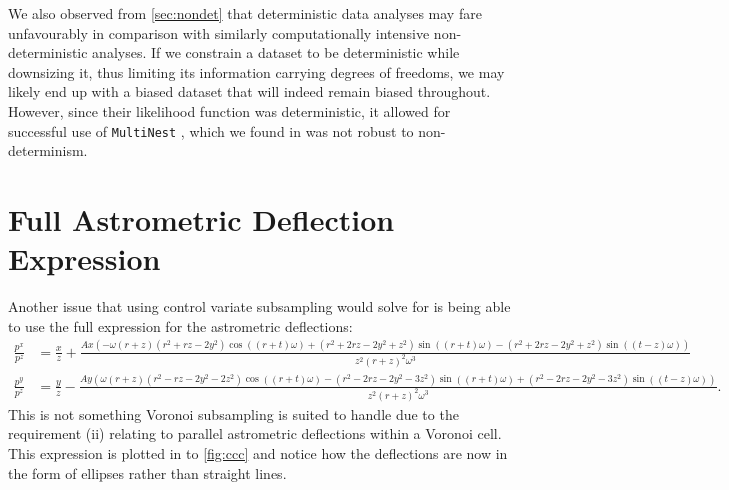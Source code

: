 We also observed from \cref{sec:nondet} that deterministic data analyses may fare unfavourably in comparison with similarly computationally intensive non-deterministic analyses. If we constrain a dataset to be deterministic while downsizing it, thus limiting its information carrying degrees of freedoms, we may likely end up with a biased dataset that will indeed remain biased throughout. However, since their likelihood function was deterministic, it allowed for successful use of \texttt{MultiNest} \cite{Feroz_2009}, which we found in  was not robust to non-determinism.

\section{Full Astrometric Deflection Expression}

Another issue that using control variate subsampling would solve for is being able to use the full expression for the astrometric deflections:
%
\begin{equation}
    \begin{aligned}
        \textstyle \frac{p^x}{p^z} &= \textstyle \frac{x}{z} + \frac{A x\left(-\omega  \left(r +z \right) \left(r^2+r z -2 y^2\right) \cos \left(\left(r + t \right) \omega \right)+\left(r^2+2 r z -2 y^2+z^2\right) \sin \left(\left(r + t \right) \omega \right)-\left(r^2+2 r z -2 y^2+z^2\right) \sin \left((t-z)\omega \right)\right)}{z^2 \left(r +z \right)^2 \omega^3} \\
        \textstyle \frac{p^y}{p^z} &= \textstyle \frac{y}{z}-\frac{Ay\left(\omega  \left(r +z \right) \left(r^2-r z -2 y^2-2 z^2\right) \cos \left( \left(r + t \right) \omega \right)-\left(r^2-2 r z -2 y^2-3 z^2\right) \sin \left(\left(r + t \right) \omega \right)+\left(r^2-2 r z -2 y^2-3 z^2\right) \sin \left((t-z)  \omega \right)\right)}{z^2 \left(r +z \right)^2 \omega^3}.
    \end{aligned}
\label{eq:nff}
\end{equation}
%
This is not something Voronoi subsampling is suited to handle due to the requirement (ii) relating to parallel astrometric deflections within a Voronoi cell. This expression is plotted in to \cref{fig:ccc} and notice how the deflections are now in the form of ellipses rather than straight lines. 


